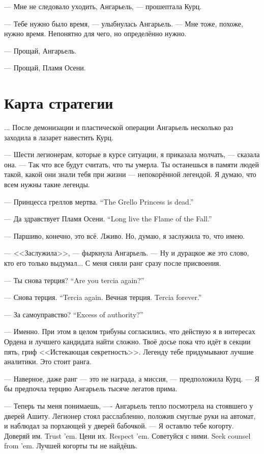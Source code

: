 --- Мне не следовало уходить, Ангарьель, --- прошептала Курц.

--- Тебе нужно было время, --- улыбнулась Ангарьель.
--- Мне тоже, похоже, нужно время.
Непонятно для чего, но определённо нужно.

--- Прощай, Ангарьель.

--- Прощай, Пламя Осени.

\section{Карта стратегии}

... После демонизации и пластической операции Ангарьель несколько раз заходила в лазарет навестить Курц.

--- Шести легионерам, которые в курсе ситуации, я приказала молчать, --- сказала она.
--- Так что все будут считать, что ты умерла.
Ты останешься в памяти людей такой, какой они знали тебя при жизни --- непокорённой легендой.
Я думаю, что всем нужны такие легенды.

{--- Принцесса греллов мертва.}
{``The Grello Princess is dead.''}

{--- Да здравствует Пламя Осени.}
{``Long live the Flame of the Fall.''}

--- Паршиво, конечно, это всё.
Лживо.
Но, думаю, я заслужила то, что имею.

--- <<Заслужила>>, --- фыркнула Ангарьель.
--- Ну и дурацкое же это слово, кто его только выдумал...
С меня сняли ранг сразу после присвоения.

{--- Ты снова терция?}
{``Are you tercia again?''}

{--- Снова терция.}
{``Tercia again.}
{Вечная терция.}
{Tercia forever.''}

{--- За самоуправство?}
{``Excess of authority?''}

--- Именно.
При этом в целом трибуны согласились, что действую я в интересах Ордена и лучшего кандидата найти сложно.
Твоё досье пока что идёт в секции пять, гриф <<Истекающая секретность>>.
Легенду тебе придумывают лучшие аналитики.
Это стоит ранга.

--- Наверное, даже ранг --- это не награда, а миссия, --- предположила Курц.
--- Я бы предпочла терцию Ангарьель тысяче легатов прима.

--- Теперь ты меня понимаешь, ---- Ангарьель тепло посмотрела на стоявшего у дверей Ашиту.
Легионер стоял расслабленно, положив смуглые руки на автомат, и наблюдал за порхающей у дверей бабочкой.
--- Я оставлю тебе когорту.
{Доверяй им.}
{Trust 'em.}
{Цени их.}
{Respect 'em.}
{Советуйся с ними.}
{Seek counsel from 'em.}
Лучшей когорты ты не найдёшь.

